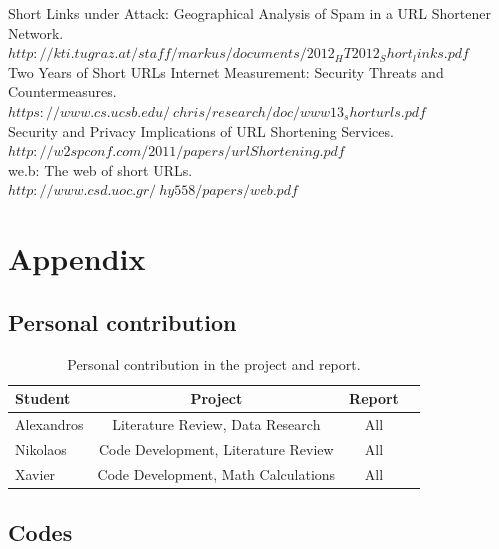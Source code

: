 \documentclass[12pt]{article}
\begin{document}
Short Links under Attack: Geographical Analysis of Spam in a URL Shortener Network.\\
$http://kti.tugraz.at/staff/markus/documents/2012_HT2012_Short_links.pdf$
\\

Two Years of Short URLs Internet Measurement: Security Threats and Countermeasures.\\
$https://www.cs.ucsb.edu/~chris/research/doc/www13_shorturls.pdf$
\\

Security and Privacy Implications of URL Shortening Services.\\
$http://w2spconf.com/2011/papers/urlShortening.pdf$
\\

we.b: The web of short URLs.\\
$http://www.csd.uoc.gr/~hy558/papers/web.pdf$
\\

\section{Appendix}

\subsection{Personal contribution}

\begin{center}
\begin{table}
		\begin{tabular}{|l|c|c|c|}
  			\hline
	  		\textbf{Student} & \textbf{Project} & \textbf{Report} \\
	  		\hline
  			Alexandros & Literature Review, Data Research & All \\ 
  			\hline
  			Nikolaos & Code Development, Literature Review & All \\
	  		\hline
  			Xavier & Code Development, Math Calculations & All \\
  			\hline
  		\end{tabular}
	\caption[A table]{Personal contribution in the project and report.}
	
\end{table}
\end{center}

\subsection{Codes}
\end{document}
